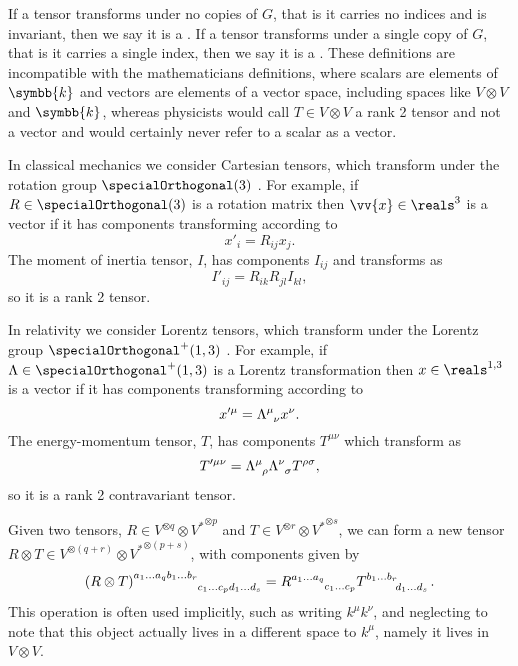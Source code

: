 \documentclass[fleqn]{NotesClass}
\renewcommand{\field}{\symbb{k}}
\newcommand{\dual}[1]{{#1^{*}}}
\newcommand{\lorentzGroup}{\specialOrthogonal^+(1, 3)}
\newcommand{\minkowskiSpace}{\reals^{1,3}}
\begin{document}
    If a tensor transforms under no copies of \(G\), that is it carries no indices and is invariant, then we say it is a .
    If a tensor transforms under a single copy of \(G\), that is it carries a single index, then we say it is a .
    These definitions are incompatible with the mathematicians definitions, where scalars are elements of \(\field\) and vectors are elements of a vector space, including spaces like \(V \otimes V\) and \(\field\), whereas physicists would call \(T \in V \otimes V\) a rank 2 tensor and not a vector and would certainly never refer to a scalar as a vector.
    
    \begin{exm}{}{}
        In classical mechanics we consider Cartesian tensors, which transform under the rotation group \(\specialOrthogonal(3)\) \cite[188]{goldstein}.
        For example, if \(R \in \specialOrthogonal(3)\) is a rotation matrix then \(\vv{x} \in \reals^3\) is a vector if it has components transforming according to
        \begin{equation}
            x'_i = R_{ij}x_j.
        \end{equation}
        The moment of inertia tensor, \(I\), has components \(I_{ij}\) and transforms as
        \begin{equation}
            I'_{ij} = R_{ik}R_{jl}I_{kl},
        \end{equation}
        so it is a rank 2 tensor.
        
        In relativity we consider Lorentz tensors, which transform under the Lorentz group \(\lorentzGroup\) \cite[36]{weinberg}.
        For example, if \(\Lambda \in \lorentzGroup\) is a Lorentz transformation then \(x \in \minkowskiSpace\) is a vector if it has components transforming according to
        \begin{equation}
            x'^\mu = \tensor{\Lambda}{^\mu_\nu}x^\nu.
        \end{equation}
        The energy-momentum tensor, \(T\), has components \(T^{\mu\nu}\) which transform as
        \begin{equation}
            T'^{\mu\nu} = \tensor{\Lambda}{^\mu_\rho}\tensor{\Lambda}{^\nu_\sigma} T^{\rho\sigma},
        \end{equation}
        so it is a rank 2 contravariant tensor.
    \end{exm}
    
    Given two tensors, \(R \in V^{\otimes q} \otimes \dual{V}^{\otimes p}\) and \(T \in V^{\otimes r} \otimes \dual{V}^{\otimes s}\), we can form a new tensor \(R \otimes T \in V^{\otimes(q + r)} \otimes \dual{V}^{\otimes(p + s)}\), with components given by \cite[37]{weinberg}
    \begin{equation}
        \tensor{(R \otimes T)}{^{a_1\dotso a_q b_1 \dotso b_r}_{c_1 \dotso c_p d_1 \dotso d_s}} = \tensor{R}{^{a_1\dotso a_q}_{c_1 \dotso c_p}} \tensor{T}{^{b_1 \dotso b_r}_{d_1 \dotso d_s}}.
    \end{equation}
    This operation is often used implicitly, such as writing \(k^\mu k^\nu\), and neglecting to note that this object actually lives in a different space to \(k^\mu\), namely it lives in \(V \otimes V\).
    
\end{document}
